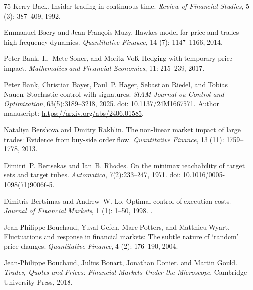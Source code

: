 \documentclass[11pt]{article}
\numberwithin{equation}{section}
\theoremstyle{definition}
\theoremstyle{remark}
\theoremstyle{definition}
\begin{document}
\begin{thebibliography}{75}
Kerry Back.
\newblock Insider trading in continuous time.
\newblock \emph{Review of Financial Studies}, 5 (3):
  387--409, 1992.

Emmanuel Bacry and Jean-Fran{\c c}ois Muzy.
\newblock Hawkes model for price and trades high-frequency dynamics.
\newblock \emph{Quantitative Finance}, 14 (7): 1147--1166,
  2014.

Peter Bank, H.~Mete Soner, and Moritz Vo{\ss}.
\newblock Hedging with temporary price impact.
\newblock \emph{Mathematics and Financial Economics}, 11: 215--239,
  2017.

Peter Bank, Christian Bayer, Paul~P. Hager, Sebastian Riedel, and Tobias Nauen.
\newblock Stochastic control with signatures.
\newblock \emph{SIAM Journal on Control and Optimization}, 63(5):3189--3218, 2025.
\newblock \href{https://doi.org/10.1137/24M1667671}{doi: 10.1137/24M1667671}.
\newblock Author manuscript: \url{https://arxiv.org/abs/2406.01585}.

Nataliya Bershova and Dmitry Rakhlin.
\newblock The non-linear market impact of large trades: Evidence from buy-side
  order flow.
\newblock \emph{Quantitative Finance}, 13 (11): 1759--1778,
  2013.

Dimitri~P. Bertsekas and Ian~B. Rhodes.
\newblock On the minimax reachability of target sets and target tubes.
\newblock \emph{Automatica}, 7(2):233--247, 1971.
\newblock doi: 10.1016/0005-1098(71)90066-5.

Dimitris Bertsimas and Andrew~W. Lo.
\newblock Optimal control of execution costs.
\newblock \emph{Journal of Financial Markets}, 1 (1): 1--50,
  1998.
\newblock {}.

Jean-Philippe Bouchaud, Yuval Gefen, Marc Potters, and Matthieu Wyart.
\newblock Fluctuations and response in financial markets: The subtle nature of
  `random' price changes.
\newblock \emph{Quantitative Finance}, 4 (2): 176--190, 2004.

Jean-Philippe Bouchaud, Julius Bonart, Jonathan Donier, and Martin Gould.
\newblock \emph{Trades, Quotes and Prices: Financial Markets Under the
  Microscope}.
\newblock Cambridge University Press, 2018.


\end{thebibliography}
\end{document}
